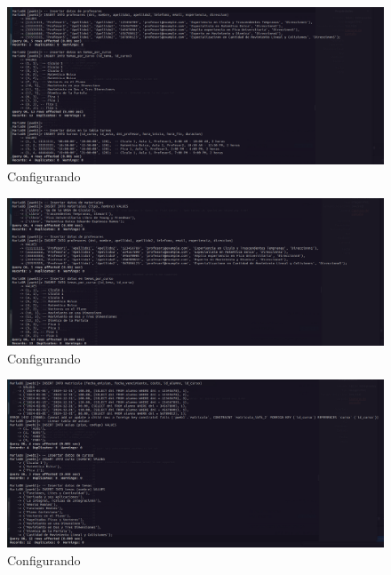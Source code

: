 \begin{figure}[H]
  \centering
  \includegraphics[width=1.0\textwidth]{img/Insertando_Datos_3.png}
  \caption{Configurando}
\end{figure}
\begin{figure}[H]
  \centering
  \includegraphics[width=1.0\textwidth]{img/Insertando_Datos_4.png}
  \caption{Configurando}
\end{figure}
\begin{figure}[H]
  \centering
  \includegraphics[width=1.0\textwidth]{img/Insertando_Datos_5.png}
  \caption{Configurando}
\end{figure}

